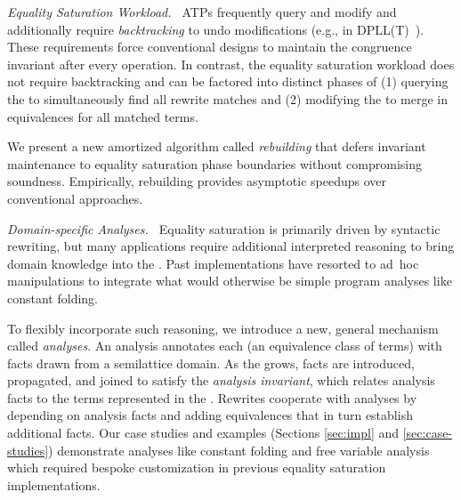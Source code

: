 \textit{Equality Saturation Workload. $\,$}
%
ATPs frequently query and modify \egraphs and
  additionally require \textit{backtracking} to
  undo modifications (e.g., in  DPLL(T)~\cite{dpll}).
These requirements force conventional \egraph designs
  to maintain the congruence invariant after every operation.
In contrast,
  the equality saturation workload does not require backtracking and
  can be factored into distinct phases of
  (1) querying the \egraph to simultaneously find all rewrite matches and
  (2) modifying the \egraph to merge in equivalences for all matched terms.

We present a new amortized algorithm
  called \textit{rebuilding} that defers \egraph invariant maintenance
  to equality saturation phase boundaries without compromising soundness.
Empirically, rebuilding provides asymptotic speedups
  over conventional approaches.

\textit{Domain-specific Analyses. $\,$}
%
Equality saturation is primarily driven by syntactic rewriting,
  but many applications require additional interpreted reasoning
  to bring domain knowledge into the \egraph.
Past implementations have resorted to
  ad~hoc \egraph manipulations
  to integrate what would otherwise be
  simple program analyses like constant folding.

To flexibly incorporate such reasoning,
  we introduce a new, general mechanism called \textit{\eclass analyses}.
An \eclass analysis annotates each \eclass
  (an equivalence class of terms)
  with facts drawn from a semilattice domain.
As the \egraph grows,
  facts are introduced, propagated, and joined
  to satisfy the \textit{\eclass analysis invariant},
  which relates analysis facts to the terms represented in the \egraph.
Rewrites cooperate with \eclass analyses by
  depending on analysis facts and
  adding equivalences that in turn
  establish additional facts.
Our case studies and examples
  (Sections \ref{sec:impl} and \ref{sec:case-studies})
  demonstrate \eclass analyses like
  constant folding and free variable analysis
  which required bespoke customization in
  previous equality saturation implementations.

